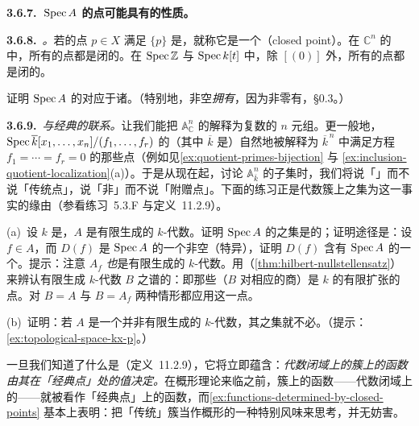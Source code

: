 \textbf{3.6.7.\ $\operatorname{Spec} A$ 的点可能具有的\trTopology{}性质。}

\textbf{3.6.8.}\ \emph{\trhDefinition{}。}\quad 若\trTopologicalSpace{}的点 $p\in X$ 满足 $\{p\}$ 是\trClosedSubset，就称它是一个\textbf{\trClosedPoint}（closed point）。在 $\mathbb{C}^n$ 的\trClassicalTopology{}中，所有的点都是闭的。在 $\operatorname{Spec}\mathbb{Z}$ 与 $\operatorname{Spec} k[t]$ 中，除 $[(0)]$ 外，所有的点都是闭的。

\begin{exercise}\label{ex:closed-points-maximal-ideals}
证明 $\operatorname{Spec} A$ 的\trClosedPoint{}对应于诸\trMaximalIdeal。（特别地，非空\trAffineScheme{}\emph{拥有}\trClosedPoint，因为非零\trRing{}有\trMaximalIdeal，\S0.3。）
\end{exercise}

\textbf{3.6.9.}\ \emph{与经典\trVarietyTheory{}的联系。}\quad \trHilbert{}\trNullstellensatz{}让我们能把 $\mathbb{A}^n_{\mathbb{C}}$ 的\trClosedPoint{}解释为复数的 $n$ 元组。更一般地，$\operatorname{Spec}\overline{k}[x_1,\dots,x_n]/(f_1,\dots,f_r)$ 的\trClosedPoint（其中 $\overline{k}$ 是\trAlgClosedField）自然地被解释为 $\overline{k}^{\,n}$ 中满足方程 $f_1=\cdots=f_r=0$ 的那些点（例如见\cref{ex:quotient-primes-bijection} 与 \cref{ex:inclusion-quotient-localization}(a)）。于是从现在起，讨论 $\mathbb{A}^n_{\overline{k}}$ 的子集时，我们将说「\trClosedPoint」而不说「传统点」，说「非\trClosedPoint{}」而不说「附赠点」。下面的练习正是代数簇上\trClosedPoint{}之集为\trDense{}这一事实的缘由（参看练习~5.3.F 与定义~11.2.9）。

\begin{exercise}\label{ex:closed-points-dense}
(a)~设 $k$ 是\trField，$A$ 是有限生成的 $k$-代数。证明 $\operatorname{Spec} A$ 的\trClosedPoint{}之集是\trDense{}的；证明途径是：设 $f\in A$，而 $D(f)$ 是 $\operatorname{Spec} A$ 的一个非空（特异）\trOpenSubset，证明 $D(f)$ 含有 $\operatorname{Spec} A$ 的一个\trClosedPoint。提示：注意 $A_f$ \emph{也}是有限生成的 $k$-代数。用\trNullstellensatz（\cref{thm:hilbert-nullstellensatz}）来辨认有限生成 $k$-代数 $B$ 之谱的\trClosedPoint：即那些\trResidueField（$B$ 对相应\trMaximalIdeal{}的商）是 $k$ 的有限扩张的点。对 $B=A$ 与 $B=A_f$ 两种情形都应用这一点。

(b)~证明：若 $A$ 是一个并非有限生成的 $k$-代数，其\trClosedPoint{}之集就不必\trDense{}。（提示：\cref{ex:topological-space-kx-p}。）
\end{exercise}

一旦我们知道了什么是\trVariety（定义~11.2.9），它将立即蕴含：\emph{代数闭域上的簇上的函数由其在「经典点」处的值决定。}在概形理论来临之前，簇上的函数——代数闭域上的——就被看作「经典点」上的函数，而\cref{ex:functions-determined-by-closed-points} 基本上表明：把「传统」簇当作概形的一种特别风味来思考，并无妨害。

